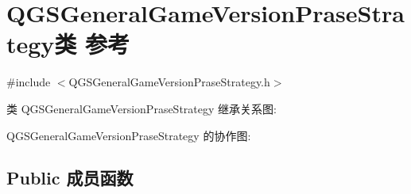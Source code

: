 \hypertarget{class_q_g_s_general_game_version_prase_strategy}{}\section{Q\+G\+S\+General\+Game\+Version\+Prase\+Strategy类 参考}
\label{class_q_g_s_general_game_version_prase_strategy}


{\ttfamily \#include $<$Q\+G\+S\+General\+Game\+Version\+Prase\+Strategy.\+h$>$}



类 Q\+G\+S\+General\+Game\+Version\+Prase\+Strategy 继承关系图\+:


Q\+G\+S\+General\+Game\+Version\+Prase\+Strategy 的协作图\+:
\subsection*{Public 成员函数}

